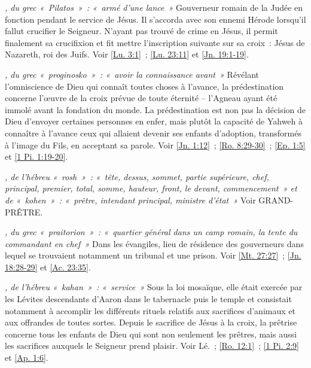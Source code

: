 \begin{multicols}{2}
\textit{, du grec «~Pilatos~»~: «~armé d'une lance~»}\newline
Gouverneur romain de la Judée en fonction pendant le service de Jésus. Il s'accorda avec son ennemi Hérode lorsqu'il fallut crucifier le Seigneur. N'ayant pas trouvé de crime en Jésus, il permit finalement sa crucifixion et fit mettre l'inscription suivante sur sa croix~: Jésus de Nazareth, roi des Juifs.\newline
Voir \vref{Lu. 3:1}~; \vref{Lu. 23:11} et \vref{Jn. 19:1-19}.

\textit{, du grec «~proginosko~»~: «~avoir la connaissance avant~»}\newline
Révélant l'omniscience de Dieu qui connaît toutes choses à l'avance, la prédestination concerne l'œuvre de la croix prévue de toute éternité – l'Agneau ayant été immolé avant la fondation du monde. La prédestination est non pas la décision de Dieu d'envoyer certaines personnes en enfer, mais plutôt la capacité de Yahweh à connaître à l'avance ceux qui allaient devenir ses enfants d'adoption, transformés à l'image du Fils, en acceptant sa parole.\newline
Voir \vref{Jn. 1:12}~; \vref{Ro. 8:29-30}~; \vref{Ep. 1:5} et \vref{1 Pi. 1:19-20}.

\textit{, de l'hébreu «~rosh~»~: «~tête, dessus, sommet, partie supérieure, chef, principal, premier, total, somme, hauteur, front, le devant, commencement~» et de «~kohen~»~: «~prêtre, intendant principal, ministre d'état~»}\newline
Voir GRAND-PRÊTRE.

\textit{, du grec «~praitorion~»~: «~quartier général dans un camp romain, la tente du commandant en chef~»}\newline
Dans les évangiles, lieu de résidence des gouverneurs dans lequel se trouvaient notamment un tribunal et une prison. Voir \vref{Mt. 27:27}~; \vref{Jn. 18:28-29} et \vref{Ac. 23:35}.

\textit{, de l'hébreu «~kahan~»~: «~service~»}\newline
Sous la loi mosaïque, elle était exercée par les Lévites descendants d'Aaron dans le tabernacle puis le temple et consistait notamment à accomplir les différents rituels relatifs aux sacrifices d'animaux et aux offrandes de toutes sortes. Depuis le sacrifice de Jésus à la croix, la prêtrise concerne tous les enfants de Dieu qui sont non seulement les prêtres, mais aussi les sacrifices auxquels le Seigneur prend plaisir. Voir Lé.~; \vref{Ro. 12:1}~; \vref{1 Pi. 2:9} et \vref{Ap. 1:6}.


\end{multicols}
